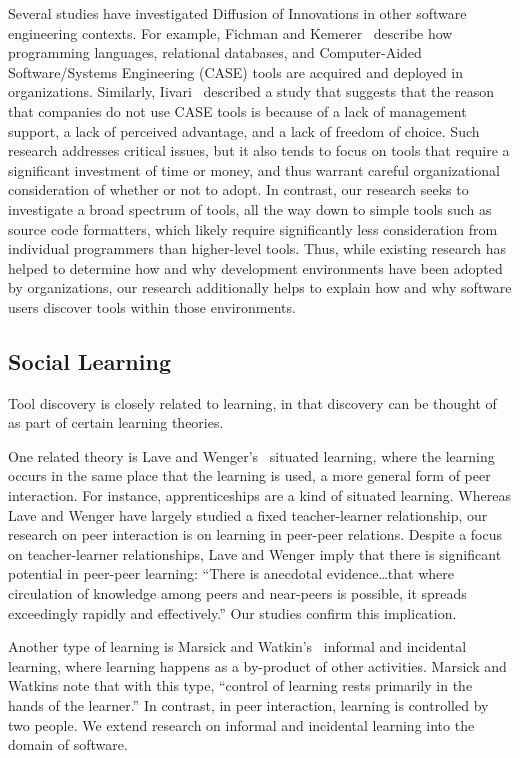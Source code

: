 \documentclass[smallextended]{svjour3}
\newcommand\discovery{peer interaction\xspace}
\begin{document}
Several studies have investigated Diffusion of Innovations in
other software engineering contexts.
For example, Fichman and Kemerer~\citeyearpar{fichman99} describe how programming
languages, relational databases, and Computer-Aided Software/Systems Engineering (CASE) tools are
acquired and deployed in organizations. 
Similarly, Iivari~\citeyearpar{iivari} described a study that suggests that the reason that
companies do not use CASE tools is because of a lack of management support, a 
lack of perceived advantage, and a lack of freedom of choice.
Such research addresses critical issues, but it also
tends to focus on tools that require a significant investment of time 
or money, and thus warrant careful organizational consideration of whether or
not to adopt. 
In contrast, our research seeks to investigate a broad spectrum of tools, all
the way down to simple tools such as source code formatters, which likely require
significantly less consideration from individual programmers than higher-level
tools. 
Thus, while existing research has helped to determine
how and why development environments have been adopted by organizations, our
research additionally helps to explain how and why software users discover tools within
those environments.

\subsection{Social Learning}

\noindent
Tool discovery is closely related to learning, in that discovery can be thought 
of as part of certain learning theories.

One related theory is Lave and Wenger's~\citeyearpar{lave} situated learning, where the learning
occurs in the same place that the learning is used, a more general form of
\discovery.
For instance, apprenticeships are a kind of situated learning. 
Whereas Lave and Wenger have largely studied a fixed teacher-learner
relationship, our research on \discovery is on learning in peer-peer relations. 
Despite a focus on teacher-learner relationships, Lave and Wenger imply that
there is significant potential in peer-peer learning: ``There is anecdotal
evidence\ldots that where circulation of knowledge among peers and near-peers
is possible, it spreads exceedingly rapidly and effectively.''
Our studies confirm this implication.

Another type of learning is Marsick and Watkin's~\citeyearpar{marsick01} informal and incidental
learning, where learning happens as a by-product of other
activities. 
Marsick and Watkins note that with this type, ``control of learning
rests primarily in the hands of the learner.''
In contrast, in \discovery, learning is controlled by two people. 
We extend research on informal and incidental learning 
into the domain of software.
\end{document}
